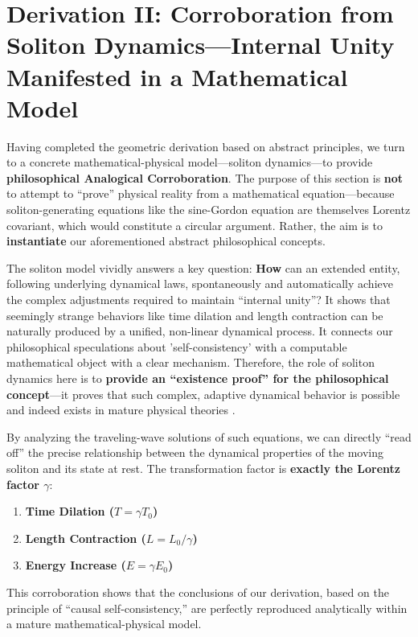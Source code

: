 \documentclass[11pt, a4paper]{article}
\begin{document}
\section{Derivation II: Corroboration from Soliton Dynamics—Internal Unity Manifested in a Mathematical Model}

Having completed the geometric derivation based on abstract principles, we turn to a concrete mathematical-physical model—soliton dynamics—to provide \textbf{philosophical Analogical Corroboration}. The purpose of this section is \textbf{not} to attempt to ``prove'' physical reality from a mathematical equation—because soliton-generating equations like the sine-Gordon equation are themselves Lorentz covariant, which would constitute a circular argument. Rather, the aim is to \textbf{instantiate} our aforementioned abstract philosophical concepts.

The soliton model vividly answers a key question: \textbf{How} can an extended entity, following underlying dynamical laws, spontaneously and automatically achieve the complex adjustments required to maintain ``internal unity''? It shows that seemingly strange behaviors like time dilation and length contraction can be naturally produced by a unified, non-linear dynamical process. It connects our philosophical speculations about 'self-consistency' with a computable mathematical object with a clear mechanism. Therefore, the role of soliton dynamics here is to \textbf{provide an ``existence proof'' for the philosophical concept}—it proves that such complex, adaptive dynamical behavior is possible and indeed exists in mature physical theories \cite{Skyrme1961, DrazinJohnson1989}.

By analyzing the traveling-wave solutions of such equations, we can directly ``read off'' the precise relationship between the dynamical properties of the moving soliton and its state at rest. The transformation factor is \textbf{exactly the Lorentz factor $\gamma$}:
\begin{enumerate}
    \item \textbf{Time Dilation ($T=\gamma T_0$)}
    \item \textbf{Length Contraction ($L=L_0/\gamma$)}
    \item \textbf{Energy Increase ($E=\gamma E_0$)}
\end{enumerate}
This corroboration shows that the conclusions of our derivation, based on the principle of ``causal self-consistency,'' are perfectly reproduced analytically within a mature mathematical-physical model.
\end{document}
